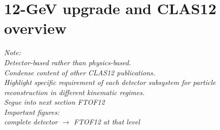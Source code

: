 \section{12-GeV upgrade and CLAS12 overview}
\label{12GeV}


{\it Note:\\
Detector-based rather than physics-based.\\
Condense content of other CLAS12 publications.\\
Highlight specific requirement of each detector subsystem for particle reconstruction in different kinematic regimes.\\
Segue into next section FTOF12 \\

Important figures: \\
complete detector $\rightarrow$ FTOF12 at that level
}

\begin{figure}[h!]
\centering
\mbox{\quad
{}}
\caption{\label{fig:tof_installed}\label{fig:tof_installation}}
\end{figure}
